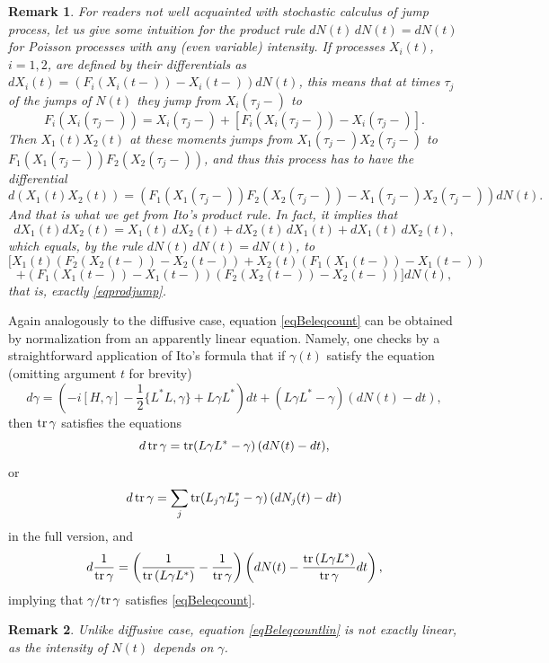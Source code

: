 \documentclass[12pt]{article}
\def\tr{\rm{tr}}
\def\ga{\gamma}
\newtheorem{remark}{Remark}
\begin{document}
\begin{remark}For readers not well acquainted with stochastic calculus of jump process,
 let us give some intuition for the product rule $dN(t)\,dN(t)=dN(t)$ for Poisson processes
 with any (even variable) intensity. If processes $X_i(t)$, $i=1,2$, are defined by
 their differentials as $dX_i(t)=(F_i(X_i(t-))-X_i(t-)) dN(t)$, this means that at times $\tau_j$
 of the jumps of $N(t)$ they jump from $X_i(\tau_j-)$ to
 \[
 F_i(X_i(\tau_j-))= X_i(\tau_j-)+[F_i(X_i(\tau_j-))-X_i(\tau_j-)].
 \]
 Then $X_1(t)X_2(t)$ at these moments jumps from $X_1(\tau_j-)X_2(\tau_j-)$
 to $F_1(X_1(\tau_j-))F_2(X_2(\tau_j-))$, and thus this process has to have the differential
 \begin{equation}
 \label{eqprodjump}
 d(X_1(t)X_2(t))=\left( F_1(X_1(\tau_j-))F_2(X_2(\tau_j-))-X_1(\tau_j-)X_2(\tau_j-)\right) dN(t).
 \end{equation}
 And that is what we get from Ito's product rule. In fact, it implies that
 \[
 dX_1(t)dX_2(t)=X_1(t) \, dX_2(t)+dX_2(t) \, dX_1(t)+dX_1(t)\, dX_2(t),
 \]
 which equals, by the rule $dN(t)\,dN(t)=dN(t)$, to
 \[
\bigl[ X_1(t)(F_2(X_2(t-))-X_2(t-))+X_2(t) (F_1(X_1(t-))-X_1(t-))
 \]
 \[
 +(F_1(X_1(t-))-X_1(t-)) (F_2(X_2(t-))-X_2(t-))\bigr] dN(t),
 \]
 that is, exactly \eqref{eqprodjump}.
\end{remark}

Again analogously to the diffusive case, equation \eqref{eqBeleqcount} can be obtained
by normalization from an apparently linear equation. Namely, one checks by a straightforward
application of Ito's formula that if $\ga(t)$ satisfy the equation (omitting argument $t$ for brevity)
 \begin{equation}
\label{eqBeleqcountlin}
d\ga=(- i[H, \ga] -\frac12 \{L^*L,\ga\}+ L\ga L^* ) dt
+(L\ga L^*-\ga) (dN(t)-dt),
\end{equation}
then ${\tr \, \ga}$ satisfies the equations
\[
d\, {\tr}\, \ga={\tr} (L\ga L^*-\ga) \, (dN(t)-dt),
\]
or
\[
d\, {\tr}\, \ga=\sum_j {\tr} (L_j\ga L_j^*-\ga) \, (dN_j(t)-dt)
\]
in the full version, and
\[
d\frac{1}{{\tr}\, \ga}=\left(\frac{1}{{\tr}\,(L\ga L^*)}-\frac{1}{{\tr}\, \ga }\right)
\left(dN(t)-\frac{{\tr}\, (L\ga L^*)}{{\tr}\, \ga} dt\right),
\]
implying that $\ga/{\tr}\,\ga$ satisfies \eqref{eqBeleqcount}.

\begin{remark}
Unlike diffusive case, equation \eqref{eqBeleqcountlin} is not exactly linear,
as the intensity of $N(t)$ depends on $\ga$.
\end{remark}
\end{document}
